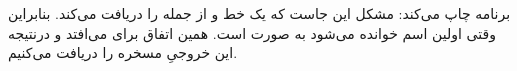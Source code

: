 \section{}
\paragraph{}\label{answer:33}
برنامه چاپ می‌کند:
\LTR\noindent
{}
\RTL
مشکل این جاست که  یک خط و از جمله  را دریافت می‌کند. بنابراین وقتی اولین اسم خوانده می‌شود به صورت  است. همین اتفاق برای  می‌افتد و درنتیجه این خروجیِ مسخره را دریافت می‌کنیم.
